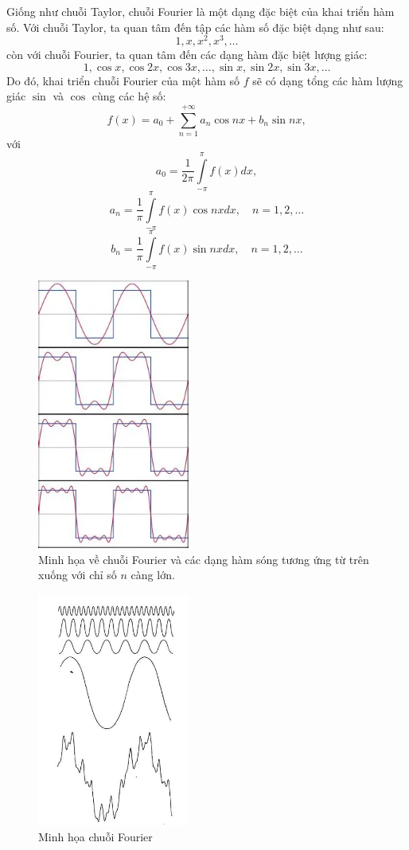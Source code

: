 \documentclass[12pt,a4paper]{report}
\numberwithin{equation}{section}
\theoremstyle{definition} %
\begin{document}
		 Giống như chuỗi Taylor, chuỗi Fourier là một dạng đặc biệt của khai triển hàm số. 
		 Với chuỗi Taylor, ta quan tâm đến tập các hàm số đặc biệt dạng như sau: 
		\begin{equation}
		\tag{a}
		1,x,x^2,x^3,\ldots
		\end{equation}
		 còn với chuỗi Fourier, ta quan tâm đến các dạng hàm đặc biệt lượng giác:
		\begin{equation}
		\tag{b}
		1,\cos x, \cos 2x, \cos 3x,\ldots,\sin x,\sin 2x,\sin 3x,\ldots
		\end{equation}
		Do đó, khai triển chuỗi Fourier của một hàm số $f$ sẽ có dạng tổng các hàm lượng giác $\sin$ và $\cos$ cùng các hệ số:
		\begin{equation}
			\tag{c}
			f(x) = a_0 + \sum_{n=1}^{+\infty}a_n\cos nx + b_n\sin nx,
		\end{equation}
với 
\[a_0 = \dfrac{1}{2\pi}\int\limits_{-\pi}^{\pi}f(x)dx,\]
\[a_n = \dfrac{1}{\pi}\int\limits_{-\pi}^{\pi}f(x)\cos nxdx,\quad n=1,2,\ldots\]
\[b_n = \dfrac{1}{\pi}\int\limits_{-\pi}^{\pi}f(x)\sin nxdx,\quad n=1,2,\ldots\]
     \begin{figure}[H]
		 \centering
		 \includegraphics[width=5cm]{img/fourier.png}
		 \caption{Minh họa về chuỗi Fourier và các dạng hàm sóng tương ứng từ trên xuống với chỉ số $n$ càng lớn.}
		 \end{figure}
		 \begin{figure}[H]
		 \centering
		 \includegraphics[width=5cm]{img/fourier1.png}
		 \caption{Minh họa chuỗi Fourier}
		 \end{figure}
\end{document}
